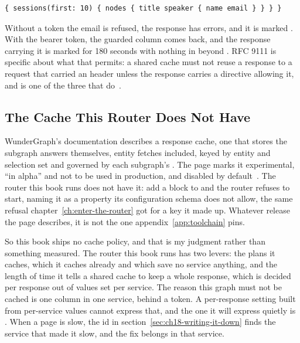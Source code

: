 \begin{verbatim}
{ sessions(first: 10) { nodes { title speaker { name email } } } }
\end{verbatim}

 Without a token the email is refused,
the response has errors, and it is marked . With the bearer
token, the guarded column comes back, and the response carrying it is marked
 for 180 seconds with nothing in  beyond
. RFC 9111 is specific about what that permits: a shared
cache must not reuse a response to a request that carried an
 header unless the response carries a directive allowing
it, and  is one of the three that do~\autocite{rfc9111}.
%

\subsection{The Cache This Router Does Not Have}

%
WunderGraph's documentation describes a response cache, one that stores the
subgraph answers themselves, entity fetches included, keyed by entity and
selection set and governed by each subgraph's . The page
marks it experimental, \enquote{in alpha} and not to be used in production, and disabled by default~\autocite{cosmoresponsecache}. The router this book runs does not
have it: add a  block to  and the router
refuses to start, naming it as a property its configuration schema does not
allow, the same refusal chapter~\ref{ch:enter-the-router} got for a key it made
up. Whatever release the page describes, it is not the one
appendix~\ref{app:toolchain} pins.

%
So this book ships no cache policy, and that is my judgment rather than
something measured. The router this book runs has two levers: the plans it
caches, which it caches already and which save no service anything, and the
length of time it tells a shared cache to keep a whole response, which is decided per response out of
values set per service. The reason this graph must not be cached is one column
in one service, behind a token. A per-response setting built from per-service
values cannot express that, and the one it will express quietly is
. When a page is slow, the id in
section~\ref{sec:ch18-writing-it-down} finds the service that made it slow, and
the fix belongs in that service.
%
